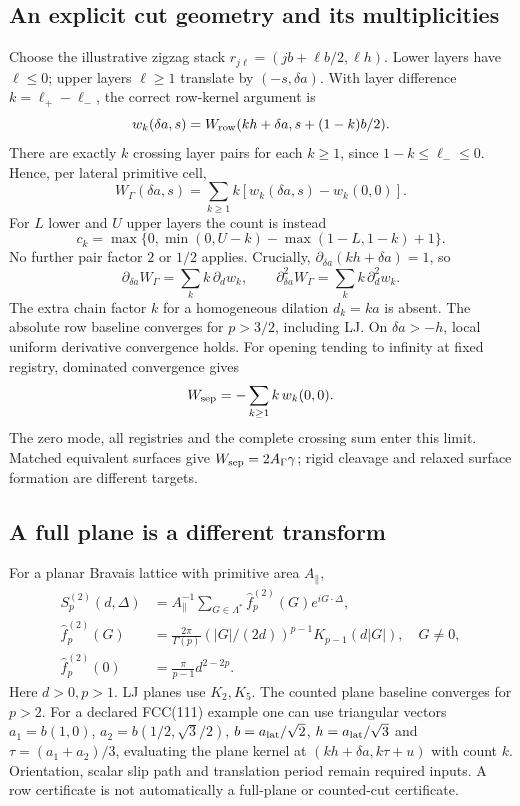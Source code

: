 \documentclass[11pt]{article}
\begin{document}
\subsection{An explicit cut geometry and its multiplicities}
Choose the illustrative zigzag stack
$r_{j\ell}=(jb+\ell b/2,\ell h)$. Lower layers have $\ell\leq0$;
upper layers $\ell\geq1$ translate by $(-s,\delta a)$. With layer difference
$k=\ell_+-\ell_-$, the correct row-kernel argument is
\begin{equation}
w_k(\delta a,s)=W_{\rm row}(kh+\delta a,s+(1-k)b/2).
\end{equation}
There are exactly $k$ crossing layer pairs for each $k\geq1$, since
$1-k\leq\ell_-\leq0$. Hence, per lateral primitive cell,
\begin{equation}
W_\Gamma(\delta a,s)=\sum_{k\geq1}k
 [w_k(\delta a,s)-w_k(0,0)].\label{eq:cut}
\end{equation}
For $L$ lower and $U$ upper layers the count is instead
\begin{equation}
c_k=\max\{0,\min(0,U-k)-\max(1-L,1-k)+1\}.
\end{equation}
No further pair factor $2$ or $1/2$ applies. Crucially,
$\partial_{\delta a}(kh+\delta a)=1$, so
\begin{equation}
\partial_{\delta a}W_\Gamma=\sum_k k\,\partial_dw_k,
\qquad \partial_{\delta a}^2W_\Gamma=\sum_k k\,\partial_d^2w_k.
\end{equation}
The extra chain factor $k$ for a homogeneous dilation $d_k=ka$ is absent.
The absolute row baseline converges for $p>3/2$, including LJ. On
$\delta a>-h$, local uniform derivative convergence holds. For opening
tending to infinity at fixed registry, dominated convergence gives
\begin{equation}
W_{\rm sep}=-\sum_{k\geq1}k\,w_k(0,0).
\end{equation}
The zero mode, all registries and the complete crossing sum enter this
limit. Matched equivalent surfaces give $W_{\rm sep}=2A_\Gamma\gamma$;
rigid cleavage and relaxed surface formation are different targets.

\subsection{A full plane is a different transform}
For a planar Bravais lattice with primitive area $A_\parallel$,
\begin{align}
S_p^{(2)}(d,\Delta)&=A_\parallel^{-1}
 \sum_{G\in\Lambda^*}\widehat f_p^{(2)}(G)e^{iG\cdot\Delta},\\
\widehat f_p^{(2)}(G)&=\frac{2\pi}{\Gamma(p)}
 (|G|/(2d))^{p-1}K_{p-1}(d|G|),\quad G\ne0,\\
\widehat f_p^{(2)}(0)&=\frac{\pi}{p-1}d^{2-2p}.
\end{align}
Here $d>0,p>1$. LJ planes use $K_2,K_5$. The counted plane baseline
converges for $p>2$. For a declared FCC(111) example one can use triangular
vectors $a_1=b(1,0)$, $a_2=b(1/2,\sqrt3/2)$,
$b=a_{\rm lat}/\sqrt2$, $h=a_{\rm lat}/\sqrt3$ and
$\tau=(a_1+a_2)/3$, evaluating the plane kernel at
$(kh+\delta a,k\tau+u)$ with count $k$. Orientation, scalar slip path
and translation period remain required inputs. A row certificate is not
automatically a full-plane or counted-cut certificate.
\end{document}
